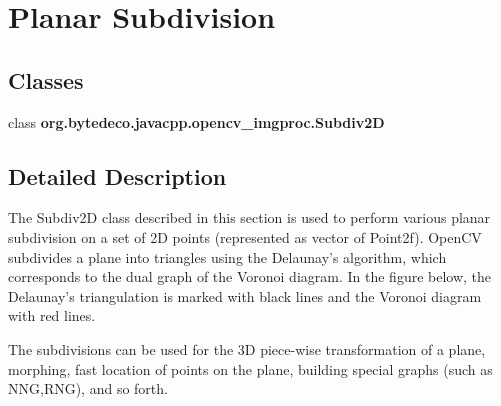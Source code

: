 \hypertarget{group__imgproc__subdiv2d}{}\section{Planar Subdivision}
\label{group__imgproc__subdiv2d}
\subsection*{Classes}
\begin{DoxyCompactItemize}
\item 
class {\bfseries org.\+bytedeco.\+javacpp.\+opencv\+\_\+imgproc.\+Subdiv2D}
\end{DoxyCompactItemize}


\subsection{Detailed Description}
The Subdiv2D class described in this section is used to perform various planar subdivision on a set of 2D points (represented as vector of Point2f). Open\+CV subdivides a plane into triangles using the Delaunay’s algorithm, which corresponds to the dual graph of the Voronoi diagram. In the figure below, the Delaunay’s triangulation is marked with black lines and the Voronoi diagram with red lines. 

 

The subdivisions can be used for the 3D piece-\/wise transformation of a plane, morphing, fast location of points on the plane, building special graphs (such as N\+NG,R\+NG), and so forth. 